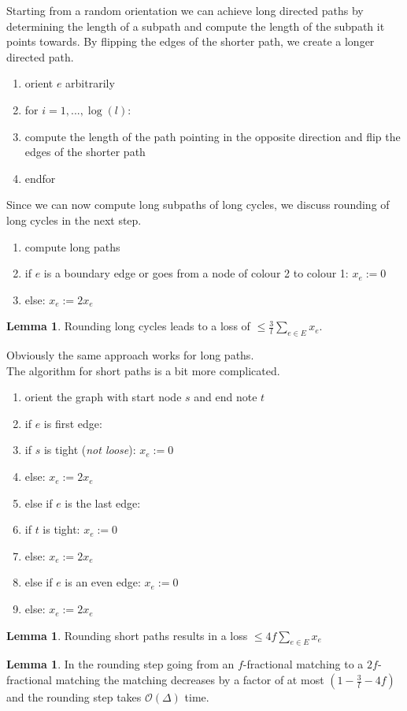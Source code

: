 \documentclass[a4paper, 12pt]{article}
\theoremstyle{plain}
\theoremstyle{definition}
\theoremstyle{lemma}
\newtheorem{lemma}[theorem]{Lemma}
\theoremstyle{remark}
\theoremstyle{corollary}
\theoremstyle{example}
\begin{document}
	Starting from a random orientation we can achieve long directed paths by determining the length of a subpath and compute the length of the subpath it points towards. By flipping the edges of the shorter path, we create a longer directed path.
	\begin{enumerate}
		\item orient $e$ arbitrarily
		\item for $i=1,...,\log(l)$:
		\item compute the length of the path pointing in the opposite direction and flip the edges of the shorter path
		\item endfor
	\end{enumerate}
	Since we can now compute long subpaths of long cycles, we discuss rounding of long cycles in the next step.
	\begin{enumerate}
		\item compute long paths
		\item if $e$ is a boundary edge or goes from a node of colour 2 to colour 1: $x_e := 0$
		\item else: $x_e := 2x_e$
	\end{enumerate}
	\begin{lemma}
		Rounding long cycles leads to a loss of $\leq \frac{3}{l} \sum_{e \in E} x_e$.
	\end{lemma}
	Obviously the same approach works for long paths.\\
	The algorithm for short paths is a bit more complicated.
	\begin{enumerate}
		\item orient the graph with start node $s$ and end note $t$
		\item if $e$ is first edge:
		\item if $s$ is tight (\textit{not loose}): $x_e := 0$
		\item else: $x_e := 2x_e$
		\item else if $e$ is the last edge:
		\item if $t$ is tight: $x_e := 0$
		\item else: $x_e := 2x_e$
		\item else if $e$ is an even edge: $x_e := 0$
		\item else: $x_e := 2x_e$ 
	\end{enumerate}
	\begin{lemma}
		Rounding short paths results in a loss $\leq 4f \sum_{e \in E} x_e$
	\end{lemma}
	\begin{lemma}
		In the rounding step going from an $f$-fractional matching to a $2f$-fractional matching the matching decreases by a factor of at most $(1-\frac{3}{l} - 4f)$ and the rounding step takes $\mathcal{O}(\Delta)$ time.
	\end{lemma}
\end{document}
